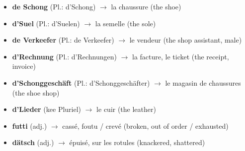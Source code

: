 \begin{itemize}
    \item \textbf{de Schong} (Pl.: d'Schong) $\rightarrow$ la chaussure (the shoe)
    \item \textbf{d'Suel} (Pl.: d'Suelen) $\rightarrow$ la semelle (the sole)
    \item \textbf{de Verkeefer} (Pl.: de Verkeefer) $\rightarrow$ le vendeur (the shop assistant, male)
    \item \textbf{d'Rechnung} (Pl.: d'Rechnungen) $\rightarrow$ la facture, le ticket (the receipt, invoice)
    \item \textbf{d'Schonggeschäft} (Pl.: d'Schonggeschäfter) $\rightarrow$ le magasin de chaussures (the shoe shop)
    \item \textbf{d'Lieder} (kee Pluriel) $\rightarrow$ le cuir (the leather)
    \item \textbf{futti} (adj.) $\rightarrow$ cassé, foutu / crevé (broken, out of order / exhausted)
    \item \textbf{dätsch} (adj.) $\rightarrow$ épuisé, sur les rotules (knackered, shattered)
\end{itemize}

\vspace{1em}

